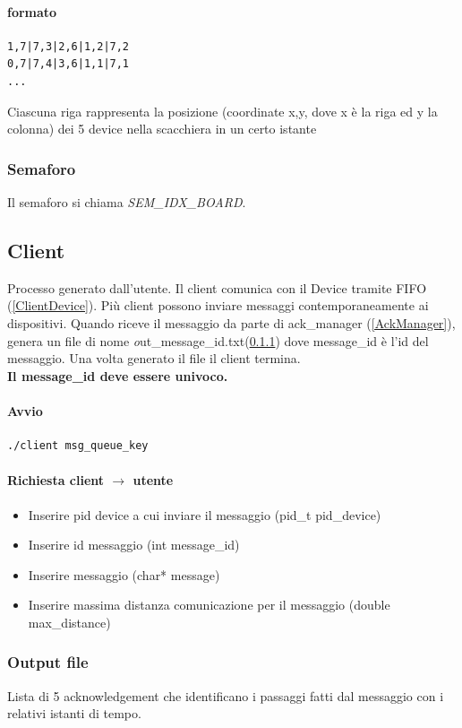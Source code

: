 \documentclass[10pt,a4paper]{article}
\begin{document}
{\paragraph{formato}
\begin{Verbatim}
1,7|7,3|2,6|1,2|7,2
0,7|7,4|3,6|1,1|7,1
...
\end{Verbatim}
Ciascuna riga rappresenta la posizione (coordinate x,y, dove x è la riga ed y la colonna) dei 5 device nella scacchiera in un certo istante
\subsubsection{Semaforo} \label{semaforo}
Il semaforo si chiama \emph{SEM\_IDX\_BOARD}.

\subsection{Client}
Processo generato dall'utente. 
Il client comunica con il Device tramite FIFO (\ref{ClientDevice}).
Più client possono inviare messaggi contemporaneamente ai dispositivi.
Quando riceve il messaggio da parte di ack\_manager (\ref{AckManager}), genera un file di nome \emph out\_message\_id.txt(\ref{outputfile}) dove message\_id è l'id del messaggio.
Una volta generato il file il client termina.
\textbf{\\Il message\_id deve essere univoco.}
\paragraph{Avvio}
\begin{verbatim}
./client msg_queue_key
\end{verbatim}
\paragraph{Richiesta client $ \rightarrow$ utente}
\begin{itemize}
\item Inserire pid device a cui inviare il messaggio (pid\_t pid\_device)
\item Inserire id messaggio (int message\_id)
\item Inserire messaggio (char* message)
\item Inserire massima distanza comunicazione per il messaggio (double max\_distance)
\end{itemize}
\subsubsection{Output file}  \label{outputfile}
Lista di 5 acknowledgement che identificano i passaggi fatti dal messaggio con i relativi istanti di tempo.
}
\end{document}
